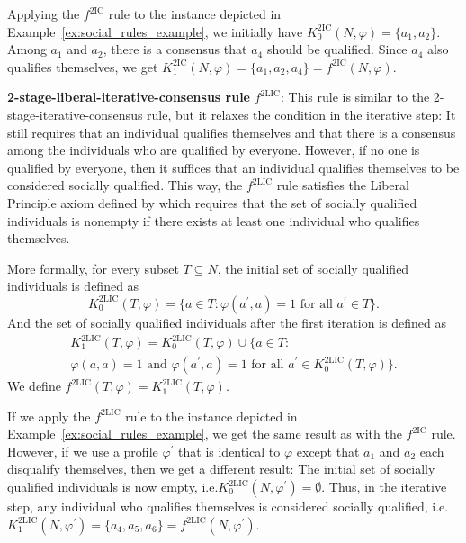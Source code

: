 \documentclass[
    12pt,               %
    a4paper,            %
    bibtotoc,           %
    pointlessnumbers,   %
    ngerman,            %
    titlepage,          %
    leqno,              %
    ]{scrarticle}       %
\newcommand\exref{Example~\ref}
\begin{document}
Applying the $f^{\text{2IC}}$ rule to the instance depicted in \exref{ex:social_rules_example}, we initially have $K^{\text{2IC}}_0(N, \varphi) = \{ a_1, a_2 \}$. Among $a_1$ and $a_2$, there is a consensus that $a_4$ should be qualified. Since $a_4$ also qualifies themselves, we get $K^{\text{2IC}}_1(N, \varphi) = \{ a_1, a_2, a_4 \} = f^{\text{2IC}}(N, \varphi)$.



\textbf{2-stage-liberal-iterative-consensus rule} $f^{\text{2LIC}}$: This rule is similar to the 2-stage-iterative-consensus rule, but it relaxes the condition in the iterative step: It still requires that an individual qualifies themselves and that there is a consensus among the individuals who are qualified by everyone. However, if no one is qualified by everyone, then it suffices that an individual qualifies themselves to be considered socially qualified. This way, the $f^{\text{2LIC}}$ rule satisfies the Liberal Principle axiom defined by \textcite{KR97} which requires that the set of socially qualified individuals is nonempty if there exists at least one individual who qualifies themselves.

More formally, for every subset $T \subseteq N$, the initial set of socially qualified individuals is defined as
$$
K^{\text{2LIC}}_0(T, \varphi) = \{ a \in T : \varphi(a^\prime, a) = 1 \text{ for all } a^\prime \in T \}.
$$
And the set of socially qualified individuals after the first iteration is defined as
\begin{multline*}
K^{\text{2LIC}}_1(T, \varphi) = K^{\text{2LIC}}_0(T, \varphi) \cup \{ a \in T : \\
\varphi(a, a) = 1 \text{ and }
\varphi(a^\prime, a) = 1 \text{ for all } a^\prime \in K^{\text{2LIC}}_0(T, \varphi) \}.
\end{multline*}
We define $f^{\text{2LIC}}(T, \varphi) = K^{\text{2LIC}}_1(T, \varphi)$.

If we apply the $f^{\text{2LIC}}$ rule to the instance depicted in \exref{ex:social_rules_example}, we get the same result as with the $f^{\text{2IC}}$ rule. However, if we use a profile $\varphi^\prime$ that is identical to $\varphi$ except that $a_1$ and $a_2$ each disqualify themselves, then we get a different result: The initial set of socially qualified individuals is now empty, i.e.\@ $K^{\text{2LIC}}_0(N, \varphi^\prime) = \emptyset$. Thus, in the iterative step, any individual who qualifies themselves is considered socially qualified, i.e.\@ $K^{\text{2LIC}}_1(N, \varphi^\prime) = \{ a_4, a_5, a_6 \} = f^{\text{2LIC}}(N, \varphi^\prime)$.
\end{document}

